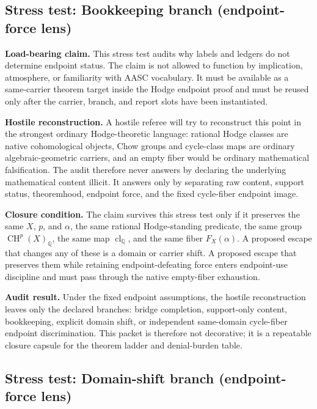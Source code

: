 \documentclass[11pt]{article}
\newcommand{\QQ}{\mathbb{Q}}
\newcommand{\CH}{\operatorname{CH}}
\newcommand{\clQ}{\operatorname{cl}_{\QQ}}
\begin{document}
\subsection{Stress test: Bookkeeping branch (endpoint-force lens)}

\par\noindent\textbf{Load-bearing claim.} This stress test audits why labels and ledgers do not determine endpoint status. The claim is not allowed to function by implication, atmosphere, or familiarity with AASC vocabulary. It must be available as a same-carrier theorem target inside the Hodge endpoint proof and must be reused only after the carrier, branch, and report slots have been instantiated.

\par\noindent\textbf{Hostile reconstruction.} A hostile referee will try to reconstruct this point in the strongest ordinary Hodge-theoretic language: rational Hodge classes are native cohomological objects, Chow groups and cycle-class maps are ordinary algebraic-geometric carriers, and an empty fiber would be ordinary mathematical falsification. The audit therefore never answers by declaring the underlying mathematical content illicit. It answers only by separating raw content, support status, theoremhood, endpoint force, and the fixed cycle-fiber endpoint image.

\par\noindent\textbf{Closure condition.} The claim survives this stress test only if it preserves the same $X$, $p$, and $\alpha$, the same rational Hodge-standing predicate, the same group $\CH^p(X)_\QQ$, the same map $\clQ$, and the same fiber $F_X(\alpha)$. A proposed escape that changes any of these is a domain or carrier shift. A proposed escape that preserves them while retaining endpoint-defeating force enters endpoint-use discipline and must pass through the native empty-fiber exhaustion.

\par\noindent\textbf{Audit result.} Under the fixed endpoint assumptions, the hostile reconstruction leaves only the declared branches: bridge completion, support-only content, bookkeeping, explicit domain shift, or independent same-domain cycle-fiber endpoint discrimination. This packet is therefore not decorative; it is a repeatable closure capsule for the theorem ladder and denial-burden table.


\subsection{Stress test: Domain-shift branch (endpoint-force lens)}
\end{document}
